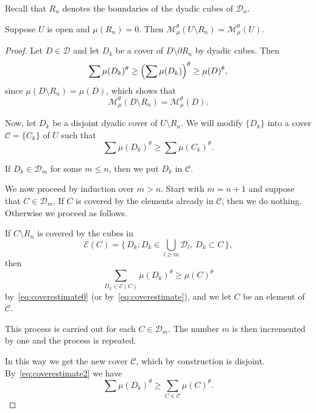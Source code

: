 Recall that $R_n$ denotes the boundaries of the dyadic cubes of $\mathscr{D}_n$.

\begin{lemm}\label{lem:opensets}
Suppose $U$ is open and $\mu (R_n) = 0$. Then $\mathscr{M}_\mu^\theta (U \setminus R_n) = \mathscr{M}_\mu^\theta (U)$.
\end{lemm}

\begin{proof}
Let $D \in \mathscr{D}$ and let $D_k$ be a cover of $D \setminus
\partial R_n$ by dyadic cubes. Then
\begin{equation}\label{eq:coverestimate0}
\sum \mu (D_k)^\theta \geq \Bigl(\sum \mu(D_k) \Bigr)^\theta \geq
\mu (D)^\theta,
\end{equation}
since $\mu (D \setminus R_n) = \mu (D)$, which shows that
\begin{equation}\label{eq:coverestimate}
\mathscr{M}_\mu^\theta (D \setminus R_n) = \mathscr{M}_\mu^\theta (D).
\end{equation}

Now, let $D_k$ be a disjoint dyadic cover of $U \setminus R_n$. We will modify $\{D_k\}$ into a cover $\mathscr{C} = \{C_k\}$ of $U$ such that
\[
\sum \mu (D_k)^\theta \geq \sum \mu (C_k)^\theta.
\]

If $D_k \in \mathscr{D}_m$ for some $m \leq n$, then we put $D_k$ in $\mathscr{C}$.

We now proceed by induction over $m > n$. Start with $m = n +1$ and suppose that $C \in \mathscr{D}_m$. If $C$ is covered by the elements already in $\mathscr{C}$, then we do nothing. Otherwise we proceed as follows.

If $C \setminus R_n$ is covered by the cubes in
\[
\mathscr{E} (C) = \biggl\{\, D_k : D_k \in \bigcup_{l \geq m}
\mathscr{D}_l,\ D_k \subset C\, \biggr\},
\]
then
\begin{equation}\label{eq:coverestimate2}
\sum_{D_k \in \mathscr{E} (C)} \mu (D_k)^\theta \geq \mu (C)^\theta
\end{equation}
by~\eqref{eq:coverestimate0} (or by~\eqref{eq:coverestimate}), and we let $C$ be an element of $\mathscr{C}$.

This process is carried out for each $C \in \mathscr{D}_m$. The number $m$ is then incremented by one and the process is repeated.

In this way we get the new cover $\mathscr{C}$, which by construction is disjoint. By~\eqref{eq:coverestimate2} we have
\begin{equation}\label{eq:coverestimate3}
\sum \mu (D_k)^\theta \geq \sum_{C \in \mathscr{C}} \mu (C)^\theta.
\end{equation}


\end{proof}
